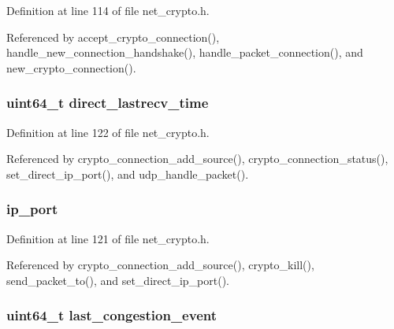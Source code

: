 Definition at line 114 of file net\+\_\+crypto.\+h.



Referenced by accept\+\_\+crypto\+\_\+connection(), handle\+\_\+new\+\_\+connection\+\_\+handshake(), handle\+\_\+packet\+\_\+connection(), and new\+\_\+crypto\+\_\+connection().

\hypertarget{struct_crypto___connection_ac6eb8a274b0dedea83359f2d9269cbc2}{
\subsubsection[{direct\+\_\+lastrecv\+\_\+time}]{\setlength{\rightskip}{0pt plus 5cm}uint64\+\_\+t direct\+\_\+lastrecv\+\_\+time}}\label{struct_crypto___connection_ac6eb8a274b0dedea83359f2d9269cbc2}


Definition at line 122 of file net\+\_\+crypto.\+h.



Referenced by crypto\+\_\+connection\+\_\+add\+\_\+source(), crypto\+\_\+connection\+\_\+status(), set\+\_\+direct\+\_\+ip\+\_\+port(), and udp\+\_\+handle\+\_\+packet().

\hypertarget{struct_crypto___connection_a86e2a5a56c0dd22df6e8b8a10e40f9e4}{
\subsubsection[{ip\+\_\+port}]{ ip\+\_\+port}}\label{struct_crypto___connection_a86e2a5a56c0dd22df6e8b8a10e40f9e4}


Definition at line 121 of file net\+\_\+crypto.\+h.



Referenced by crypto\+\_\+connection\+\_\+add\+\_\+source(), crypto\+\_\+kill(), send\+\_\+packet\+\_\+to(), and set\+\_\+direct\+\_\+ip\+\_\+port().

\hypertarget{struct_crypto___connection_ad33f09e937800c05f22fa695e756554d}{
\subsubsection[{last\+\_\+congestion\+\_\+event}]{\setlength{\rightskip}{0pt plus 5cm}uint64\+\_\+t last\+\_\+congestion\+\_\+event}}\label{struct_crypto___connection_ad33f09e937800c05f22fa695e756554d}


